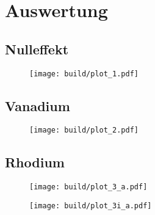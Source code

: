 \section{Auswertung}
\label{sec:auswertung}

\subsection{Nulleffekt}

\begin{table}[H]
	\centering
	\caption{}
	\makebox[\linewidth][c]{}
	\label{tab:1}
\end{table}

\begin{figure}[H]
	\centering
	\texttt{[image: build/plot\_1.pdf]}
	\caption{}
	\label{fig:1}
\end{figure}

\subsection{Vanadium}

\begin{table}[H]
	\centering
	\caption{}
	\makebox[\linewidth][c]{}
	\label{tab:2}
\end{table}

\begin{figure}[H]
	\centering
	\texttt{[image: build/plot\_2.pdf]}
	\caption{}
	\label{fig:2}
\end{figure}

\subsection{Rhodium}

\begin{table}[H]
	\centering
	\caption{}
	\makebox[\linewidth][c]{}
	\label{tab:3_a}
\end{table}

\begin{figure}[H]
	\centering
	\texttt{[image: build/plot\_3\_a.pdf]}
	\caption{}
	\label{fig:3_a}
\end{figure}

\begin{figure}[H]
	\centering
	\texttt{[image: build/plot\_3i\_a.pdf]}
	\caption{}
	\label{fig:3i_a}
\end{figure}

